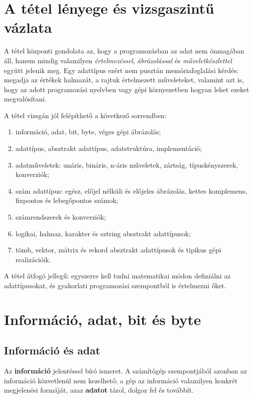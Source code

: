 \section{A tétel lényege és vizsgaszintű vázlata}

\begin{summarybox}
A tétel központi gondolata az, hogy a programozásban az adat nem önmagában áll, hanem mindig valamilyen \emph{értelmezéssel}, \emph{ábrázolással} és \emph{műveletkészlettel} együtt jelenik meg. Egy adattípus ezért nem pusztán memóriafoglalási kérdés: megadja az értékek halmazát, a rajtuk értelmezett műveleteket, valamint azt is, hogy az adott programozási nyelvben vagy gépi környezetben hogyan lehet ezeket megvalósítani.
\end{summarybox}

A tétel vizsgán jól felépíthető a következő sorrendben:

\begin{enumerate}
  \item információ, adat, bit, byte, véges gépi ábrázolás;
  \item adattípus, absztrakt adattípus, adatstruktúra, implementáció;
  \item adatműveletek: unáris, bináris, n-áris műveletek, zártság, típuskényszerek, konverziók;
  \item szám adattípus: egész, előjel nélküli és előjeles ábrázolás, kettes komplemens, fixpontos és lebegőpontos számok;
  \item számrendszerek és konverziók;
  \item logikai, halmaz, karakter és sztring absztrakt adattípusok;
  \item tömb, vektor, mátrix és rekord absztrakt adattípusok és tipikus gépi realizációik.
\end{enumerate}

A tétel átfogó jellegű: egyszerre kell tudni matematikai módon definiálni az adattípusokat, és gyakorlati programozási szempontból is értelmezni őket.

\section{Információ, adat, bit és byte}

\subsection{Információ és adat}

Az \textbf{információ} jelentéssel bíró ismeret. A számítógép szempontjából azonban az információ közvetlenül nem kezelhető; a gép az információ valamilyen konkrét megjelenési formáját, azaz \textbf{adatot} tárol, dolgoz fel és továbbít.

